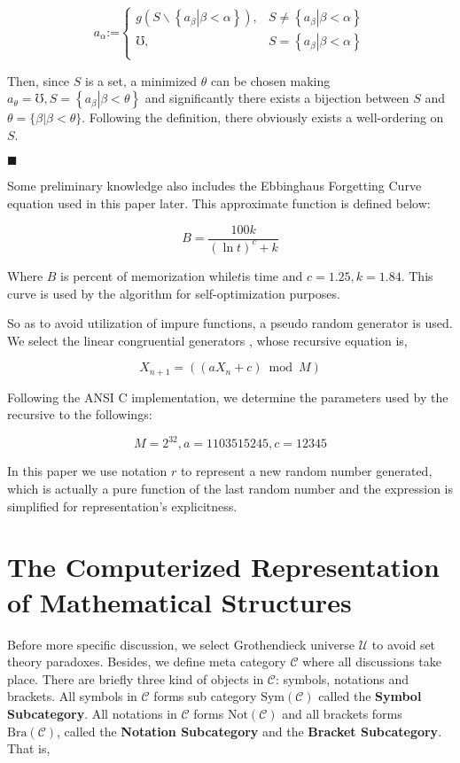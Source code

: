 \documentclass{article}
\begin{document}
\[a_{\alpha }\text{:=}\left\{
\begin{array}{cc}
 g\left(S\backslash \left\{\left.a_{\beta }\right|\beta <\alpha \right\}\right), & S\neq \left\{\left.a_{\beta }\right|\beta <\alpha \right\} \\
 \mho , & S=\left\{\left.a_{\beta }\right|\beta <\alpha \right\} \\
\end{array}
\right.\]

Then, since \(S\) is a set, a minimized \(\theta\) can be chosen making \(a_{\theta }=\mho , S=\left\{\left.a_{\beta }\right|\beta <\theta \right\}\) and significantly there exists a bijection between \(S\) and \(\theta =\{\beta |\beta <\theta \}\). Following the definition, there obviously exists a well-ordering on \(S\).
\begin{flushright}
	$\blacksquare $
\end{flushright}

Some preliminary knowledge also includes the Ebbinghaus Forgetting Curve equation \cite{4} used in this paper later. This approximate function is defined below:

\[B=\frac{100 k}{(\ln  t)^c+k}\]

Where \(B\) is percent of memorization while\(t\)is time and \(c=1.25,k=1.84\). This curve is used by the algorithm for self-optimization purposes.

So as to avoid utilization of impure functions, a pseudo random generator is used. We select the linear congruential generators \cite{5}, whose recursive equation is,

\[X_{n+1}=(\left(a X_n+c\right) \bmod M)\]

Following the ANSI C implementation, we determine the parameters used by the recursive to the followings:

\[M=2^{32},a=1103515245, c=12345\]

In this paper we use notation \(\mathit{r}\) to represent a new random number generated, which is actually a pure function of the last random number and the expression is simplified for representation{'}s explicitness.

\section*{The Computerized Representation of Mathematical Structures}

Before more specific discussion, we select Grothendieck universe \(\mathcal{U}\) \cite{1} to avoid set theory paradoxes. Besides, we define meta category \(\mathcal{C}\) where all discussions take place. There are briefly three kind of objects in \(\mathcal{C}\): symbols, notations and brackets. All symbols in \(\mathcal{C}\) forms sub category \(\text{Sym}(\mathcal{C})\) called the \textbf{ Symbol Subcategory}. All notations in \(\mathcal{C}\) forms \(\text{Not}(\mathcal{C})\) and all brackets forms \(\text{Bra}(\mathcal{C})\), called the \textbf{ Notation Subcategory} and the \textbf{ Bracket Subcategory}. That is,
\end{document}
